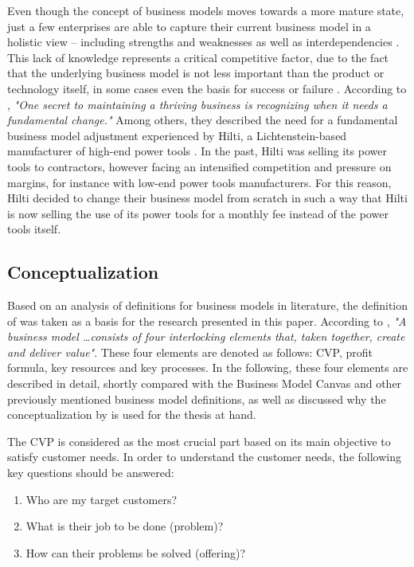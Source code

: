 Even though the concept of business models moves towards a more mature state, just a few enterprises are able to capture their current business model in a holistic view -- including strengths and weaknesses as well as interdependencies \citep[p. 52]{Johnson2008}. This lack of knowledge represents a critical competitive factor, due to the fact that the underlying business model is not less important than the product or technology itself, in some cases even the basis for success or failure . According to \citet[p. 50]{Johnson2008}, \textit{"One secret to maintaining a thriving business is recognizing when it needs a fundamental change."} Among others, they described the need for a fundamental business model adjustment experienced by Hilti, a Lichtenstein-based manufacturer of high-end power tools \citep[pp. 54-57]{Johnson2008}. In the past, Hilti was selling its power tools to contractors, however facing an intensified competition and pressure on margins, for instance with low-end power tools manufacturers. For this reason, Hilti decided to change their business model from scratch in such a way that Hilti is now selling the use of its power tools for a monthly fee instead of the power tools itself.

\subsection{Conceptualization}\label{ch:sota:bmc}

Based on an analysis of definitions for business models in literature, the definition of \citet{Johnson2008} was taken as a basis for the research presented in this paper. According to \citet[p. 52]{Johnson2008}, \textit{"A business model \ldots consists of four interlocking elements that, taken together, create and deliver value"}. These four elements are denoted as follows: \ac{CVP}, profit formula, key resources and key processes. In the following, these four elements are described in detail, shortly compared with the Business Model Canvas \citep{Osterwalder2010} and other previously mentioned business model definitions, as well as discussed why the conceptualization by \citet{Johnson2008} is used for the thesis at hand.

The \ac{CVP} is considered as the most crucial part based on its main objective to satisfy customer needs. In order to understand the customer needs, the following key questions should be answered: 

\begin{enumerate}[parsep=0pt, topsep=0pt, itemsep=0pt]
	\item Who are my target customers?
	\item What is their job to be done (problem)?
	\item How can their problems be solved (offering)? 
\end{enumerate}

